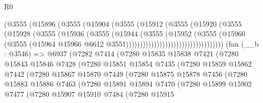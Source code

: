 \begin{lexlean}{R0}
\begin{coremodule}
                                  (@3555
                                    (@15896
                                      (@3555
                                        (@15904
                                          (@3555
                                            (@15912
                                              (@3555
                                                (@15920
                                                  (@3555
                                                    (@15928
                                                      (@3555
                                                        (@15936
                                                          (@3555
                                                            (@15944
                                                              (@3555
                                                                (@15952
                                                                  (@3555
                                                                    (@15960
                                                                      (@3555
                                                                        (@15964
                                                                          @15966
                                                                          @6612
                                                                          @3551)))))))))))))))))))))))))))))))))))
    (fun (__b : @3546) =>
    @6937
      (@7282
        @7414
        (@7280
          @15835
          @15838
          @7421
          (@7280
            @15843
            @15846
            @7428
            (@7280
              @15851
              @15854
              @7435
              (@7280
                @15859
                @15862
                @7442
                (@7280
                  @15867
                  @15870
                  @7449
                  (@7280
                    @15875
                    @15878
                    @7456
                    (@7280
                      @15883
                      @15886
                      @7463
                      (@7280
                        @15891
                        @15894
                        @7470
                        (@7280
                          @15899
                          @15902
                          @7477
                          (@7280
                            @15907
                            @15910
                            @7484
                            (@7280
                              @15915

\end{coremodule}
\end{lexlean}

